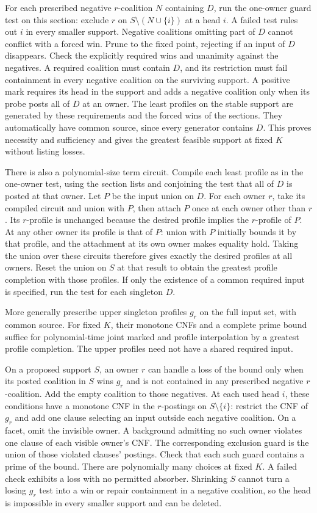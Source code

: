 For each prescribed negative $r$-coalition $N$ containing
$D$, run the one-owner guard test on this section:
exclude $r$ on $S\setminus(N\cup\{i\})$ at a head $i$.
A failed test rules out $i$ in every smaller support.
Negative coalitions omitting part of $D$ cannot conflict
with a forced win. Prune to the fixed point, rejecting
if an input of $D$ disappears. Check the explicitly
required wins and unanimity against the negatives.
A required coalition must contain $D$, and its
restriction must fail containment in every negative
coalition on the surviving support. A positive mark
requires its head in the support and adds a negative
coalition only when its probe posts all of $D$ at an
owner. The least profiles on the stable support are
generated by these requirements and the forced wins
of the sections. They automatically have common source,
since every generator contains $D$. This proves
necessity and sufficiency and gives the greatest
feasible support at fixed $K$ without listing losses.

There is also a polynomial-size term circuit. Compile
each least profile as in the one-owner test, using the
section lists and conjoining the test that all of $D$
is posted at that owner. Let $P$ be the input union
on $D$. For each owner $r$, take its compiled circuit
and union with $P$, then attach $P$ once at each owner
other than $r$. Its $r$-profile is unchanged because
the desired profile implies the $r$-profile of $P$.
At any other owner its profile is that of $P$: union
with $P$ initially bounds it by that profile, and the
attachment at its own owner makes equality hold.
Taking the union over these circuits therefore gives
exactly the desired profiles at all owners. Reset
the union on $S$ at that result to obtain the greatest
profile completion with those profiles.
If only the existence of a common required input is
specified, run the test for each singleton $D$.

More generally prescribe upper singleton profiles $g_r$
on the full input set, with common source. For fixed $K$,
their monotone CNFs and a complete prime bound suffice
for polynomial-time joint marked and profile
interpolation by a greatest profile completion. The
upper profiles need not have a shared required input.

On a proposed support $S$, an owner $r$ can handle a
loss of the bound only when its posted coalition in
$S$ wins $g_r$ and is not contained in any prescribed
negative $r$-coalition. Add the empty coalition to those
negatives. At each used head $i$, these conditions
have a monotone CNF in the $r$-postings on $S\setminus\{i\}$:
restrict the CNF of $g_r$ and add one clause selecting
an input outside each negative coalition. On a facet,
omit the invisible owner. A background admitting no
such owner violates one clause of each visible owner's
CNF. The corresponding exclusion guard is the union
of those violated clauses' postings. Check that each
such guard contains a prime of the bound. There are
polynomially many choices at fixed $K$. A failed check
exhibits a loss with no permitted absorber. Shrinking
$S$ cannot turn a losing $g_r$ test into a win or repair
containment in a negative coalition, so the head is
impossible in every smaller support and can be deleted.

